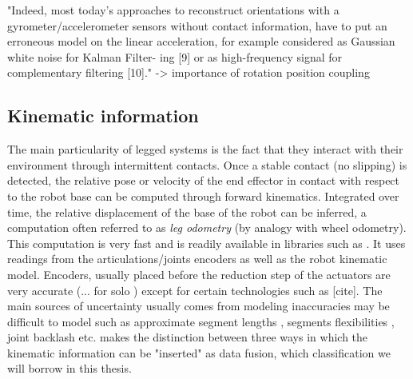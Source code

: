 "Indeed, most today’s approaches to reconstruct orientations with
a gyrometer/accelerometer sensors without contact information, have to put an erroneous model on the linear acceleration, 
for example considered as Gaussian white noise for Kalman Filter- ing [9] or as high-frequency signal for complementary filtering [10]."
-> importance of rotation position coupling







\subsection{Kinematic information}
The main particularity of legged systems is the fact that they interact with their environment through intermittent contacts.
Once a stable contact (no slipping) is detected, the relative pose or velocity of the end effector in contact with respect to the robot base 
can be computed through forward kinematics. Integrated over time, the relative displacement of the base of the robot can be inferred, a computation 
often referred to as \textit{leg odometry} (by analogy with wheel odometry). This computation is very fast and is readily available in libraries such as \cite{carpentier2019pinocchio, hereid2017frost}. It uses
readings from the articulations/joints encoders as well as the robot kinematic model. Encoders, usually placed before the reduction step of the actuators
are very accurate (... for solo \cite{grimminger2020open}) except for certain technologies such as [cite]. The main sources of uncertainty usually comes from
modeling inaccuracies may be difficult to model such as approximate segment lengths , segments flexibilities \cite{vigne2018estimation}, 
joint backlash \cite{fallon2014drift} etc. \cite{bloesch2018technical} makes the distinction between three ways in which the kinematic information can be "inserted" as data fusion, 
which classification we will borrow in this thesis. 


